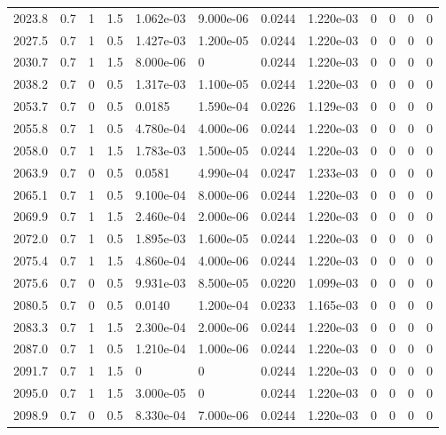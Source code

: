 \documentclass[preview]{standalone}
\begin{document}
{{{{{{{{{{{{\begin{tabular}{L{1.2cm}C{1.2cm} C{0.3cm}C{0.5cm} C{1.4cm}C{1.4cm} C{1.4cm}C{1.4cm} C{1.6cm}C{1.6cm} C{1.6cm}C{1.6cm}}
  2023.8  &   0.7  & 1     & 1.5 &  1.062e-03  & 9.000e-06  &  0.0244&   1.220e-03& 0 & 0   &  0 & 0  \\ 
  2027.5  &   0.7  & 1     & 0.5 &  1.427e-03  & 1.200e-05  &  0.0244&   1.220e-03& 0 & 0   &  0 & 0  \\ 
  2030.7  &   0.7  & 1     & 1.5 &  8.000e-06  & 0  &  0.0244&   1.220e-03& 0 & 0   &  0 & 0  \\ 
  2038.2  &   0.7  & 0     & 0.5 &  1.317e-03  & 1.100e-05  &  0.0244&   1.220e-03& 0 & 0   &  0 & 0  \\ 
  2053.7  &   0.7  & 0     & 0.5 &  0.0185  & 1.590e-04  &  0.0226&   1.129e-03& 0 & 0   &  0 & 0  \\ 
  2055.8  &   0.7  & 1     & 0.5 &  4.780e-04  & 4.000e-06  &  0.0244&   1.220e-03& 0 & 0   &  0 & 0  \\ 
  2058.0  &   0.7  & 1     & 1.5 &  1.783e-03  & 1.500e-05  &  0.0244&   1.220e-03& 0 & 0   &  0 & 0  \\ 
  2063.9  &   0.7  & 0     & 0.5 &  0.0581  & 4.990e-04  &  0.0247&   1.233e-03& 0 & 0   &  0 & 0  \\ 
  2065.1  &   0.7  & 1     & 0.5 &  9.100e-04  & 8.000e-06  &  0.0244&   1.220e-03& 0 & 0   &  0 & 0  \\ 
  2069.9  &   0.7  & 1     & 1.5 &  2.460e-04  & 2.000e-06  &  0.0244&   1.220e-03& 0 & 0   &  0 & 0  \\ 
  2072.0  &   0.7  & 1     & 0.5 &  1.895e-03  & 1.600e-05  &  0.0244&   1.220e-03& 0 & 0   &  0 & 0  \\ 
  2075.4  &   0.7  & 1     & 1.5 &  4.860e-04  & 4.000e-06  &  0.0244&   1.220e-03& 0 & 0   &  0 & 0  \\ 
  2075.6  &   0.7  & 0     & 0.5 &  9.931e-03  & 8.500e-05  &  0.0220&   1.099e-03& 0 & 0   &  0 & 0  \\ 
  2080.5  &   0.7  & 0     & 0.5 &  0.0140  & 1.200e-04  &  0.0233&   1.165e-03& 0 & 0   &  0 & 0  \\ 
  2083.3  &   0.7  & 1     & 1.5 &  2.300e-04  & 2.000e-06  &  0.0244&   1.220e-03& 0 & 0   &  0 & 0  \\ 
  2087.0  &   0.7  & 1     & 0.5 &  1.210e-04  & 1.000e-06  &  0.0244&   1.220e-03& 0 & 0   &  0 & 0  \\ 
  2091.7  &   0.7  & 1     & 1.5 &  0  & 0  &  0.0244&   1.220e-03& 0 & 0   &  0 & 0  \\ 
  2095.0  &   0.7  & 1     & 1.5 &  3.000e-05  & 0  &  0.0244&   1.220e-03& 0 & 0   &  0 & 0  \\ 
  2098.9  &   0.7  & 0     & 0.5 &  8.330e-04  & 7.000e-06  &  0.0244&   1.220e-03& 0 & 0   &  0 & 0  \\ 

\end{tabular}}}}}}}}}}}}}
\end{document}
